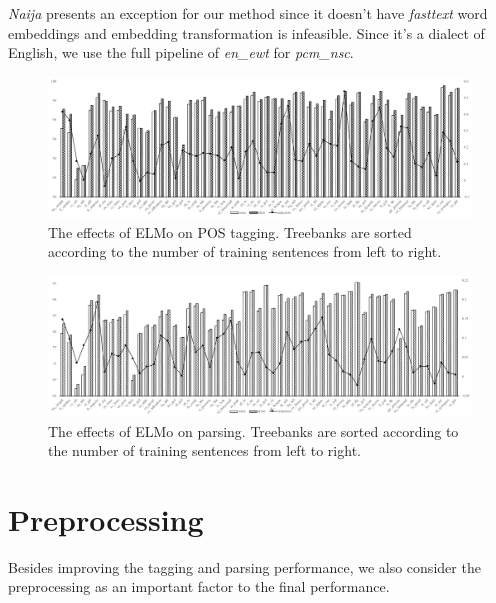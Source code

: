 \documentclass[11pt,a4paper]{article}
\begin{document}
\textit{Naija} presents an exception for our method since it doesn't have \textit{fasttext}
word embeddings and embedding transformation is infeasible.
Since it's a dialect of English, we use the full pipeline of \textit{en\_ewt} for \textit{pcm\_nsc}.
\begin{figure}[t]
	\includegraphics[width=\textwidth]{effects_elmo_tagger}
	\caption{The effects of ELMo on POS tagging.
		Treebanks are sorted according to the number of training sentences from left to right.}\label{fig:elmo-effect-pos}
\end{figure}
\begin{figure}[t]
	\includegraphics[width=\textwidth]{effects_elmo_parser}
	\caption{The effects of ELMo on parsing.
		Treebanks are sorted according to the number of training sentences from left to right.}\label{fig:elmo-effect-par}
\end{figure}

\section{Preprocessing}
Besides improving the tagging and parsing performance,
we also consider the preprocessing as an important factor to
the final performance.
\end{document}

